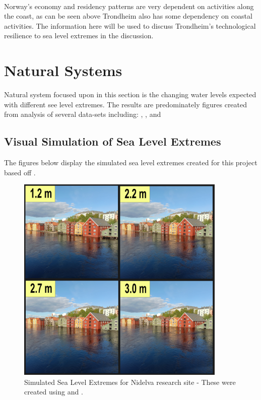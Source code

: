 \paragraph{}

Norway's economy and residency patterns are very dependent on activities along the coast\cite{aunan_strong_2008}, as can be seen above Trondheim also has some dependency on coastal activities. The information here will be used to discuss Trondheim's technological resilience to sea level extremes in the discussion. 

\newpage

\section{Natural Systems}
Natural system focused upon in this section is the changing water levels expected with different see level extremes. The results are predominately figures created from analysis of several  data-sets including: \cite{geonorge_stormflo_nodate} , \cite{kartverket_se_2021}, \cite{stormflo_database_stormflo_2021} and \cite{ipcc_sea_2021}

\subsection{Visual Simulation of Sea Level Extremes}
The figures below display the simulated sea level extremes created for this project based off \cite{kartverket_se_2020}.

\begin{figure}[h!]
    \centering
    \includegraphics[width=10cm]{fig_sle/nidelva 2090 q.png}
    \caption{Simulated Sea Level Extremes for Nidelva research site - These were created using \cite{kartverket_se_2021} and \cite{stormflo_database_stormflo_2021}. }
    \label{fig:SLE-nidelva}
\end{figure}

